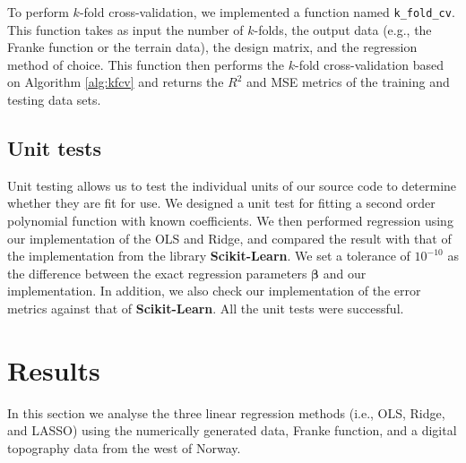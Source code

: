 \documentclass[a4paper]{article}
\begin{document}
To perform $k$-fold cross-validation, we implemented a function named \texttt{k\_fold\_cv}. This function takes as input the number of $k$-folds, the output data (e.g., the Franke function or the terrain data), the design matrix, and the regression method of choice. This function then performs the $k$-fold cross-validation based on Algorithm \ref{alg:kfcv} and returns the $R^2$ and MSE metrics of the training and testing data sets.

\subsection{Unit tests}
Unit testing allows us to test the individual units of our source code to determine whether they are fit for use. We designed a unit test for fitting a second order polynomial function with known coefficients. We then performed regression using our implementation of the OLS and Ridge, and compared the result with that of the implementation from the library \textbf{Scikit-Learn}. We set a tolerance of $10^{-10}$ as the difference between the exact regression parameters $\boldsymbol{\beta}$ and our implementation. In addition, we also check our implementation of the error metrics against that of \textbf{Scikit-Learn}. All the unit tests were successful. 

\section{Results}
In this section we analyse the three linear regression methods (i.e., OLS, Ridge, and LASSO) using the numerically generated data, Franke function, and a digital topography data from the west of Norway.
\end{document}
